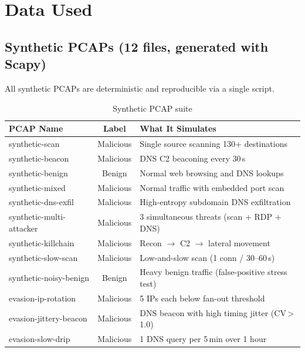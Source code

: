 \documentclass[11pt, a4paper]{article}
\begin{document}
\section{Data Used}

\subsection{Synthetic PCAPs (12 files, generated with Scapy)}

All synthetic PCAPs are deterministic and reproducible via a single script.

\begin{table}[H]
\centering\small
\caption{Synthetic PCAP suite}
\label{tab:pcaps}
\begin{tabularx}{\textwidth}{@{} l c L{6.5cm} @{}}
\toprule
\textbf{PCAP Name} & \textbf{Label} & \textbf{What It Simulates} \\
\midrule
synthetic-scan          & Malicious & Single source scanning 130+ destinations \\
synthetic-beacon        & Malicious & DNS C2 beaconing every 30\,s \\
synthetic-benign        & Benign    & Normal web browsing and DNS lookups \\
synthetic-mixed         & Malicious & Normal traffic with embedded port scan \\
synthetic-dns-exfil     & Malicious & High-entropy subdomain DNS exfiltration \\
synthetic-multi-attacker& Malicious & 3 simultaneous threats (scan + RDP + DNS) \\
synthetic-killchain     & Malicious & Recon $\rightarrow$ C2 $\rightarrow$ lateral movement \\
synthetic-slow-scan     & Malicious & Low-and-slow scan (1 conn / 30--60\,s) \\
synthetic-noisy-benign  & Benign    & Heavy benign traffic (false-positive stress test) \\
evasion-ip-rotation     & Malicious & 5 IPs each below fan-out threshold \\
evasion-jittery-beacon  & Malicious & DNS beacon with high timing jitter (CV\,>\,1.0) \\
evasion-slow-drip       & Malicious & 1 DNS query per 5\,min over 1 hour \\
\bottomrule
\end{tabularx}
\end{table}
\end{document}
